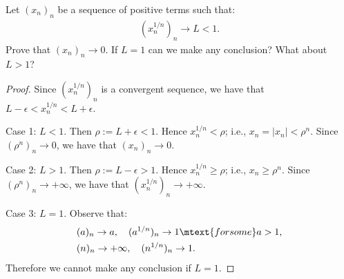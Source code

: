 \documentclass[10pt,twoside,openany]{memoir}
\begin{document}
        \begin{exercise}
            Let $(x_n)_n$ be a sequence of positive terms such that:
                \begin{equation*}
                \begin{split}
                    (x_n^{1/n})_n \rightarrow L <1.
                \end{split}
                \end{equation*}
            Prove that $(x_n)_n \rightarrow 0 $. If $L = 1$ can we make any conclusion? What about $L > 1$?
        \end{exercise}
            \begin{proof}
                Since $(x_n^{1/n})_n$ is a convergent sequence, we have that $L - \epsilon < x_n^{1/n} < L + \epsilon$.

                Case 1: $L < 1$. Then $\rho := L+\epsilon < 1$. Hence $x_n^{1/n} < \rho$; i.e., $x_n = |x_n| < \rho^n$. Since $(\rho^n)_n \rightarrow 0$, we have that $(x_n)_n \rightarrow 0$.

                Case 2: $L > 1$. Then $\rho := L - \epsilon >1$. Hence $x_n^{1/n} \geq \rho$; i.e., $x_n \geq \rho^n$. Since $(\rho^n)_n \rightarrow +\infty$, we have that $(x_n^{1/n})_n \rightarrow +\infty$.

                Case 3: $L = 1$. Observe that:
                    \begin{equation*}
                    \begin{split}
                        &(a)_n \rightarrow a, \hspace{10pt} (a^{1/n})_n \rightarrow 1 \mtext{for some} a > 1, \\
                        &(n)_n \rightarrow +\infty, \hspace{10pt} (n^{1/n})_n \rightarrow 1.
                    \end{split}
                    \end{equation*}
                Therefore we cannot make any conclusion if $L = 1$.
            \end{proof}
\end{document}
